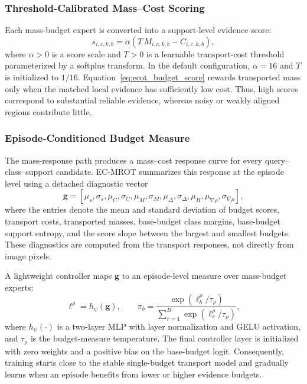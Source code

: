 \documentclass[journal]{IEEEtran}
\newcommand{\method}{EC-MROT}
\newcommand{\1}{\mathbf{1}}
\begin{document}
\subsubsection{Threshold-Calibrated Mass--Cost Scoring}
Each mass-budget expert is converted into a support-level evidence score:
\begin{equation}
    s_{i,c,k,b}
    =
    \alpha\left(T\,M_{i,c,k,b}-C_{i,c,k,b}\right),
    \label{eq:ecot_budget_score}
\end{equation}
where $\alpha>0$ is a score scale and $T>0$ is a learnable transport-cost threshold parameterized by a softplus transform. In the default configuration, $\alpha=16$ and $T$ is initialized to $1/16$. Equation~\eqref{eq:ecot_budget_score} rewards transported mass only when the matched local evidence has sufficiently low cost. Thus, high scores correspond to substantial reliable evidence, whereas noisy or weakly aligned regions contribute little.

\subsubsection{Episode-Conditioned Budget Measure}
The mass-response path produces a mass--cost response curve for every query--class--support candidate. \method{} summarizes this response at the episode level using a detached diagnostic vector
\begin{equation}
    \mathbf{g}
    =
    [
    \mu_s,\sigma_s,
    \mu_C,\sigma_C,
    \mu_M,\sigma_M,
    \mu_\Delta,\sigma_\Delta,
    \mu_H,
    \mu_{\nabla\rho},\sigma_{\nabla\rho}
    ] ,
    \label{eq:ecot_diagnostics}
\end{equation}
where the entries denote the mean and standard deviation of budget scores, transport costs, transported masses, base-budget class margins, base-budget support entropy, and the score slope between the largest and smallest budgets. These diagnostics are computed from the transport responses, not directly from image pixels.

A lightweight controller maps $\mathbf{g}$ to an episode-level measure over mass-budget experts:
\begin{equation}
    \boldsymbol{\ell}^{\rho}
    =
    h_\psi(\mathbf{g}),
    \qquad
    \pi_b
    =
    \frac{
        \exp(\ell_b^{\rho}/\tau_\rho)
    }{
        \sum_{r=1}^{B}\exp(\ell_r^{\rho}/\tau_\rho)
    },
    \label{eq:ecot_budget_policy}
\end{equation}
where $h_\psi(\cdot)$ is a two-layer MLP with layer normalization and GELU activation, and $\tau_\rho$ is the budget-measure temperature. The final controller layer is initialized with zero weights and a positive bias on the base-budget logit. Consequently, training starts close to the stable single-budget transport model and gradually learns when an episode benefits from lower or higher evidence budgets.
\end{document}
